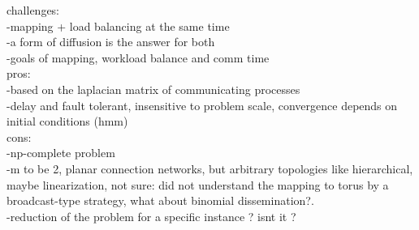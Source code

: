challenges:\\
-mapping + load balancing at the same time\\
-a form of diffusion is the answer for both\\
-goals of mapping, workload balance and comm time\\
pros:\\
-based on the laplacian matrix of communicating processes\\ 
-delay and fault tolerant, insensitive to problem scale, convergence depends on initial conditions (hmm)\\
cons:\\
-np-complete problem\\
-m to be 2, planar connection networks, but arbitrary topologies like hierarchical, maybe linearization, not sure: did not understand the mapping to torus by a broadcast-type strategy, what about binomial dissemination?.\\
-reduction of the problem for a specific instance ? isnt it ?
